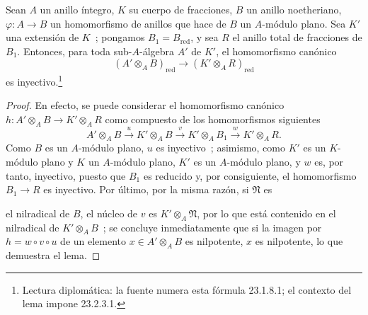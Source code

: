 \begin{lemma}[23.2.3]
\label{0.23.2.3-fr}
Sean $A$ un anillo íntegro, $K$ su cuerpo de fracciones, $B$ un anillo
noetheriano, $\varphi:A\to B$ un homomorfismo de anillos que hace de $B$ un
$A$-módulo plano. Sea $K'$ una extensión de $K$~; pongamos
$B_1=B_{\mathrm{red}}$, y sea $R$ el anillo total de fracciones de $B_1$.
Entonces, para toda sub-$A$-álgebra $A'$ de $K'$, el homomorfismo canónico
\begin{equation}
\label{0.23.1.8.1-fr}
  (A'\otimes_AB)_{\mathrm{red}}
  \longrightarrow(K'\otimes_AR)_{\mathrm{red}}
  \tag{23.2.3.1}
\end{equation}
es inyectivo.\footnote{Lectura diplomática: la fuente numera esta fórmula 23.1.8.1; el contexto del lema impone 23.2.3.1.}
\end{lemma}

\begin{proof}
En efecto, se puede considerar el homomorfismo canónico
$h:A'\otimes_AB\to K'\otimes_AR$ como compuesto de los homomorfismos siguientes
\[
  A'\otimes_AB\xrightarrow{u}K'\otimes_AB
  \xrightarrow{v}K'\otimes_AB_1\xrightarrow{w}K'\otimes_AR.
\]
Como $B$ es un $A$-módulo plano, $u$ es inyectivo~; asimismo, como $K'$ es un
$K$-módulo plano y $K$ un $A$-módulo plano, $K'$ es un $A$-módulo plano, y
$w$ es, por tanto, inyectivo, puesto que $B_1$ es reducido y, por consiguiente, el homomorfismo
$B_1\to R$ es inyectivo. Por último, por la misma razón, si $\mathfrak N$ es


el nilradical de $B$, el núcleo de $v$ es $K'\otimes_A\mathfrak N$, por lo que está
contenido en el nilradical de $K'\otimes_AB$~; se concluye inmediatamente que si
la imagen por $h=w\circ v\circ u$ de un elemento $x\in A'\otimes_AB$ es
nilpotente, $x$ es nilpotente, lo que demuestra el lema.
\end{proof}

